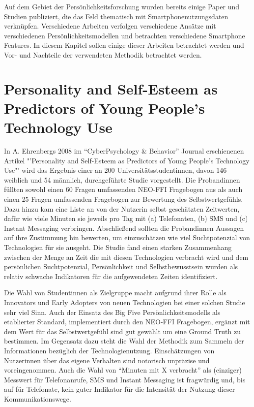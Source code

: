 Auf dem Gebiet der Persönlichkeitsforschung wurden bereits einige Paper und Studien publiziert,
die das Feld thematisch mit Smartphonenutzungsdaten verknüpfen. 
Verschiedene Arbeiten verfolgen verschiedene Ansätze mit verschiedenen Persönlichkeitsmodellen und betrachten verschiedene Smartphone Features.
In diesem Kapitel sollen einige dieser Arbeiten betrachtet werden und Vor- und Nachteile der verwendeten Methodik betrachtet werden.

\section*{Personality and Self-Esteem as Predictors of Young People’s Technology Use}

In A. Ehrenbergs 2008 im "`CyberPsychology \& Behavior"' Journal erschienenen Artikel "'Personality and Self-Esteem as Predictors of Young People’s Technology Use"' \cite{ehrenberg2008personality}
wird das Ergebnis einer an 200 Universitätsstudentinnen, davon 146 weiblich und 54  männlich, durchgeführte Studie vorgestellt.
Die Probandinnen füllten sowohl einen 60 Fragen umfassenden NEO-FFI Fragebogen aus als auch einen 25 Fragen umfassenden Fragebogen zur Bewertung des Selbstwertgefühls.
Dazu hinzu kam eine Liste an von der Nutzerin selbst geschätzten Zeitwerten, dafür wie viele Minuten sie jeweils pro Tag mit (a) Telefonaten, (b) SMS und (c) Instant Messaging verbringen.
Abschließend sollten die Probandinnen Aussagen auf ihre Zustimmung hin bewerten, um einzuschätzen wie viel Suchtpotenzial von Technologien für sie ausgeht.
Die Studie fand einen starken Zusammenhang zwischen der Menge an Zeit die mit diesen Technologien verbracht wird und dem persönlichen Suchtpotenzial, Persönlichkeit und Selbstbewusstsein wurden als relativ schwache Indikatoren für die aufgewendeten Zeiten identifiziert.
\par
Die Wahl von Studentinnen als Zielgruppe macht aufgrund ihrer Rolle als Innovators und Early Adopters von neuen Technologien bei einer solchen Studie sehr viel Sinn.
Auch der Einsatz des Big Five Persönlichkeitsmodells als etablierter Standard, implementiert durch den NEO-FFI Fragebogen, ergänzt mit dem Wert für das Selbstwertgefühl sind gut gewählt um eine Ground Truth zu bestimmen.
Im Gegensatz dazu steht die Wahl der Methodik zum Sammeln der Informationen bezüglich der Technologienutzung.
Einschätzungen von Nutzerinnen über das eigene Verhalten sind notorisch unpräzise und voreingenommen.
Auch die Wahl von "`Minuten mit X verbracht"' als (einziger) Messwert für Telefonanrufe, SMS und Instant Messaging ist fragwürdig und, bis auf für Telefonate, kein guter Indikator für die Intensität der Nutzung dieser Kommunikationswege.


